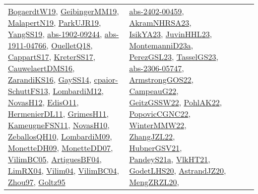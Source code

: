 {\begin{longtable}{lp{3cm}>{\raggedright}p{6cm}>{\raggedright}p{6cm}p{8cm}}
\href{papers/BogaerdtW19.pdf}{BogaerdtW19}\cite{BogaerdtW19}, \href{papers/GeibingerMM19.pdf}{GeibingerMM19}\cite{GeibingerMM19}, \href{papers/MalapertN19.pdf}{MalapertN19}\cite{MalapertN19}, \href{papers/ParkUJR19.pdf}{ParkUJR19}\cite{ParkUJR19}, \href{papers/YangSS19.pdf}{YangSS19}\cite{YangSS19}, \href{articles/abs-1902-09244.pdf}{abs-1902-09244}\cite{abs-1902-09244}, \href{articles/abs-1911-04766.pdf}{abs-1911-04766}\cite{abs-1911-04766}, \href{papers/OuelletQ18.pdf}{OuelletQ18}\cite{OuelletQ18}, \href{papers/CappartS17.pdf}{CappartS17}\cite{CappartS17}, \href{articles/KreterSS17.pdf}{KreterSS17}\cite{KreterSS17}, \href{papers/CauwelaertDMS16.pdf}{CauwelaertDMS16}\cite{CauwelaertDMS16}, \href{articles/ZarandiKS16.pdf}{ZarandiKS16}\cite{ZarandiKS16}, \href{papers/GaySS14.pdf}{GaySS14}\cite{GaySS14}, \href{papers/cpaior-SchuttFS13.pdf}{cpaior-SchuttFS13}\cite{cpaior-SchuttFS13}, \href{articles/LombardiM12.pdf}{LombardiM12}\cite{LombardiM12}, \href{articles/NovasH12.pdf}{NovasH12}\cite{NovasH12}, \href{papers/EdisO11.pdf}{EdisO11}\cite{EdisO11}, \href{papers/HermenierDL11.pdf}{HermenierDL11}\cite{HermenierDL11}, \href{papers/GrimesH11.pdf}{GrimesH11}\cite{GrimesH11}, \href{papers/KameugneFSN11.pdf}{KameugneFSN11}\cite{KameugneFSN11}, \href{articles/NovasH10.pdf}{NovasH10}\cite{NovasH10}, \href{articles/ZeballosQH10.pdf}{ZeballosQH10}\cite{ZeballosQH10}, \href{papers/LombardiM09.pdf}{LombardiM09}\cite{LombardiM09}, \href{papers/MonetteDH09.pdf}{MonetteDH09}\cite{MonetteDH09}, \href{papers/MonetteDD07.pdf}{MonetteDD07}\cite{MonetteDD07}, \href{articles/VilimBC05.pdf}{VilimBC05}\cite{VilimBC05}, \href{papers/ArtiguesBF04.pdf}{ArtiguesBF04}\cite{ArtiguesBF04}, \href{papers/LimRX04.pdf}{LimRX04}\cite{LimRX04}, \href{papers/Vilim04.pdf}{Vilim04}\cite{Vilim04}, \href{papers/VilimBC04.pdf}{VilimBC04}\cite{VilimBC04}, \href{articles/Zhou97.pdf}{Zhou97}\cite{Zhou97}, \href{papers/Goltz95.pdf}{Goltz95}\cite{Goltz95} & \href{articles/abs-2402-00459.pdf}{abs-2402-00459}\cite{abs-2402-00459}, \href{articles/AkramNHRSA23.pdf}{AkramNHRSA23}\cite{AkramNHRSA23}, \href{articles/IsikYA23.pdf}{IsikYA23}\cite{IsikYA23}, \href{papers/JuvinHHL23.pdf}{JuvinHHL23}\cite{JuvinHHL23}, \href{articles/MontemanniD23a.pdf}{MontemanniD23a}\cite{MontemanniD23a}, \href{papers/PerezGSL23.pdf}{PerezGSL23}\cite{PerezGSL23}, \href{papers/TasselGS23.pdf}{TasselGS23}\cite{TasselGS23}, \href{articles/abs-2306-05747.pdf}{abs-2306-05747}\cite{abs-2306-05747}, \href{papers/ArmstrongGOS22.pdf}{ArmstrongGOS22}\cite{ArmstrongGOS22}, \href{articles/CampeauG22.pdf}{CampeauG22}\cite{CampeauG22}, \href{papers/GeitzGSSW22.pdf}{GeitzGSSW22}\cite{GeitzGSSW22}, \href{articles/PohlAK22.pdf}{PohlAK22}\cite{PohlAK22}, \href{papers/PopovicCGNC22.pdf}{PopovicCGNC22}\cite{PopovicCGNC22}, \href{papers/WinterMMW22.pdf}{WinterMMW22}\cite{WinterMMW22}, \href{papers/ZhangJZL22.pdf}{ZhangJZL22}\cite{ZhangJZL22}, \href{articles/HubnerGSV21.pdf}{HubnerGSV21}\cite{HubnerGSV21}, \href{articles/PandeyS21a.pdf}{PandeyS21a}\cite{PandeyS21a}, \href{articles/VlkHT21.pdf}{VlkHT21}\cite{VlkHT21}, \href{papers/GodetLHS20.pdf}{GodetLHS20}\cite{GodetLHS20}, \href{articles/AstrandJZ20.pdf}{AstrandJZ20}\cite{AstrandJZ20}, \href{articles/MengZRZL20.pdf}{MengZRZL20}\cite{MengZRZL20}, 
\end{longtable}}

